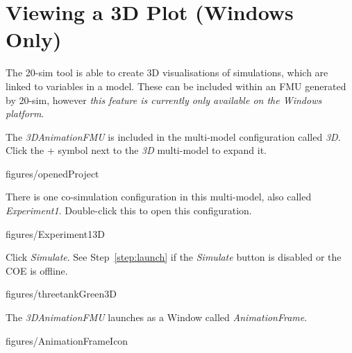 \documentclass[11pt,a4paper]{../tutorial}
\begin{document}
\section{Viewing a 3D Plot (Windows Only)}

The 20-sim tool is able to create 3D visualisations of simulations, which are linked to variables in a model. These can be included within an FMU generated by 20-sim, however \emph{this feature is currently only available on the Windows platform}.

\begin{instructions}
\item The \emph{3DAnimationFMU} is included in the multi-model configuration called \emph{3D}. Click the + symbol next to the \emph{3D} multi-model to expand it.

    \begin{annotation}[width=0.53\linewidth,trim=0 0 250 200,clip]{figures/openedProject}
    \end{annotation}

\item There is one co-simulation configuration in this multi-model, also called \emph{Experiment1}. Double-click this to open this configuration.

    \begin{annotation}[width=0.53\linewidth,trim=0 0 250 200,clip]{figures/Experiment13D}
    \end{annotation}

\newpage
\item Click \emph{Simulate}. See Step~\ref{step:launch} if the \emph{Simulate} button is disabled or the COE is offline.

    \begin{annotation}[width=0.85\linewidth,trim=0 140 0 110,clip]{figures/threetankGreen3D}
    \end{annotation}

\item  The \emph{3DAnimationFMU} launches as a Window called \emph{AnimationFrame}.

    \begin{annotation}[scale=0.6]{figures/AnimationFrameIcon}
    \end{annotation}


\end{instructions}
\end{document}
